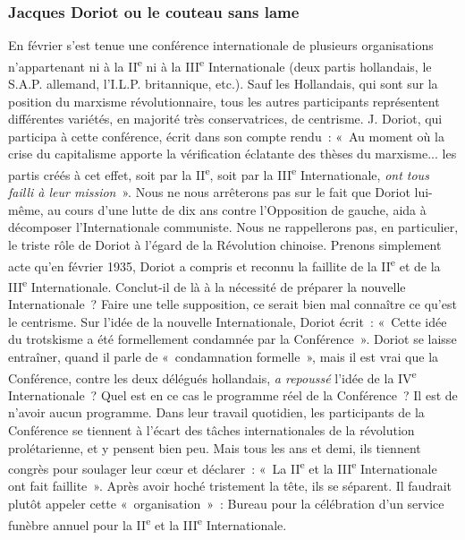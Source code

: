 \documentclass[french,twoside]{book} %
\begin{document}
\subsubsection[{Jacques Doriot ou le couteau sans lame}]{Jacques Doriot ou le couteau sans lame}
\noindent En février s’est tenue une conférence internationale de plusieurs organisations n’appartenant ni à la II\textsuperscript{e} ni à la III\textsuperscript{e} Internationale (deux partis hollandais, le S.A.P. allemand, l’I.L.P. britannique, etc.). Sauf les Hollandais, qui sont sur la position du marxisme révolutionnaire, tous les autres participants représentent différentes variétés, en majorité très conservatrices, de centrisme. J. Doriot, qui participa à cette conférence, écrit dans son compte rendu : « Au moment où la crise du capitalisme apporte la vérification  éclatante des thèses du marxisme... les partis créés à cet effet, soit par la II\textsuperscript{e}, soit par la III\textsuperscript{e} Internationale, \emph{ont tous failli à leur mission} ». Nous ne nous arrêterons pas sur le fait que Doriot lui-même, au cours d’une lutte de dix ans contre l’Opposition de gauche, aida à décomposer l’Internationale communiste. Nous ne rappellerons pas, en particulier, le triste rôle de Doriot à l’égard de la Révolution chinoise. Prenons simplement acte qu’en février 1935, Doriot a compris et reconnu la faillite de la II\textsuperscript{e} et de la III\textsuperscript{e} Internationale. Conclut-il de là à la nécessité de préparer la nouvelle Internationale ? Faire une telle supposition, ce serait bien mal connaître ce qu’est le centrisme. Sur l’idée de la nouvelle Internationale, Doriot écrit : « Cette idée du trotskisme a été formellement condamnée par la Conférence ». Doriot se laisse entraîner, quand il parle de « condamnation formelle », mais il est vrai que la Conférence, contre les deux délégués hollandais, \emph{a repoussé} l’idée de la IV\textsuperscript{e} Internationale ? Quel est en ce cas le programme réel de la Conférence ? Il est de n’avoir aucun programme. Dans leur travail quotidien, les participants de la Conférence se tiennent à l’écart des tâches internationales de la révolution prolétarienne, et y pensent bien peu. Mais tous les ans et demi, ils tiennent congrès pour soulager leur cœur et déclarer : « La II\textsuperscript{e} et la III\textsuperscript{e} Internationale ont fait faillite ». Après avoir hoché tristement la tête, ils se séparent. Il faudrait plutôt appeler cette « organisation » : Bureau pour la célébration d’un service funèbre annuel pour la II\textsuperscript{e} et la III\textsuperscript{e} Internationale.\par
\end{document}
